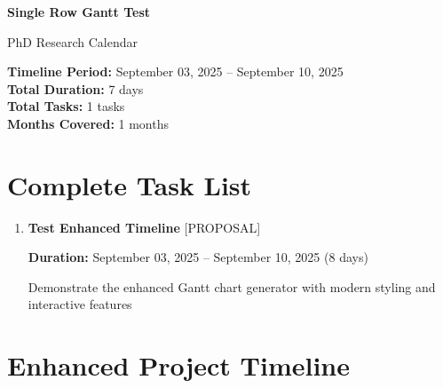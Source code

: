 \documentclass[landscape,a4paper]{article}
\begin{document}
\begin{titlepage}
\centering
\vspace*{1cm}

{\LARGE\textbf{Single Row Gantt Test}}

\vspace{0.5cm}
{\large PhD Research Calendar}

\vspace{1cm}

\begin{minipage}{0.9\textwidth}
\centering
\textbf{Timeline Period:} September 03, 2025 -- September 10, 2025\\
\textbf{Total Duration:} 7 days\\
\textbf{Total Tasks:} 1 tasks\\
\textbf{Months Covered:} 1 months
\end{minipage}

\vfill

\end{titlepage}
\newpage

\section{Complete Task List}
\vspace{0.5cm}

\begin{enumerate}[leftmargin=1.5cm, itemsep=1em, parsep=0.5em]

    \item \textcolor{researchcore}{\textbf{\large Test Enhanced Timeline}}
          \hfill \textcolor{black!60}{\small [PROPOSAL]}
          
          \vspace{0.2em}
          \textcolor{black!70}{\textbf{Duration:} September 03, 2025 -- September 10, 2025 (8 days)}

          \vspace{0.4em}
          \begin{minipage}[t]{0.9\textwidth}
          \textcolor{black!85}{Demonstrate the enhanced Gantt chart generator with modern styling and interactive features}
          \end{minipage}
\end{enumerate}
\newpage
\section*{Enhanced Project Timeline}
\end{document}
